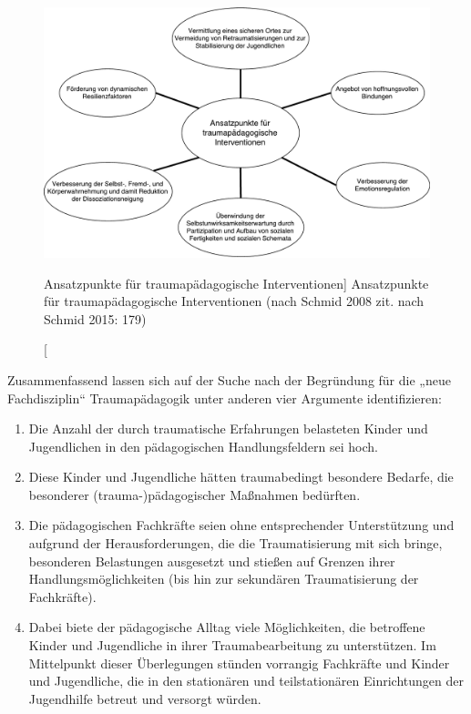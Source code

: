 \begin{figure}[h]
  \centering
  \includegraphics[scale=0.5]{abbildung5}
  \caption
      [Ansatzpunkte für traumapädagogische Interventionen]
      {Ansatzpunkte für traumapädagogische Interventionen (nach Schmid 2008 zit. nach Schmid 2015: 179)}
  \label{fig:ansatzpunkte}
\end{figure}

Zusammenfassend lassen sich auf der Suche nach der Begründung für die „neue Fachdisziplin“ Traumapädagogik unter anderen vier Argumente identifizieren:

\begin{enumerate}
\item Die Anzahl der durch traumatische Erfahrungen belasteten Kinder und Jugendlichen in den pädagogischen Handlungsfeldern sei hoch.  
\item Diese Kinder und Jugendliche hätten traumabedingt besondere Bedarfe, die besonderer (trauma-)pädagogischer Maßnahmen bedürften.  
\item Die pädagogischen Fachkräfte seien ohne entsprechender Unterstützung und aufgrund der Herausforderungen, die die Traumatisierung mit sich bringe, besonderen Belastungen ausgesetzt und stießen auf Grenzen ihrer Handlungsmöglichkeiten (bis hin zur sekundären Traumatisierung der Fachkräfte).  
\item Dabei biete der pädagogische Alltag viele Möglichkeiten, die betroffene Kinder und Jugendliche in ihrer Traumabearbeitung zu unterstützen. Im Mittelpunkt dieser Überlegungen stünden vorrangig Fachkräfte und Kinder und Jugendliche, die in den stationären und teilstation{\"a}ren Einrichtungen der Jugendhilfe betreut und versorgt würden.
\end{enumerate}
